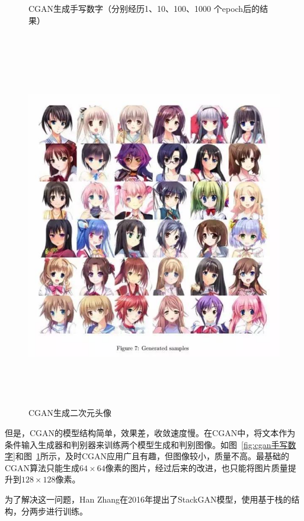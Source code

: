 \begin{figure}[t]
\begin{minipage}[c]{0.6\textwidth}
\begin{minipage}[c]{0.9\textwidth}
    \end{minipage}
  \caption{CGAN生成手写数字（分别经历1、10、100、1000 个epoch后的结果）} %
  \label{fig:cgan手写数字} 
  \end{minipage}
  \hfill 
  \begin{minipage}[c]{0.3\textwidth} 
  \centering%
  \centerline{\includegraphics[width=1\textwidth]{figures/moegirl.jpg}}
  \caption{CGAN生成二次元头像} 
  \label{fig:萌娘} 
  \end{minipage} 
  \end{figure}

但是，CGAN的模型结构简单，效果差，收敛速度慢。在CGAN中，将文本作为条件输入生成器和判别器来训练两个模型生成和判别图像。如图~\ref{fig:cgan手写数字}和图~\ref{fig:萌娘}所示，及时CGAN应用广且有趣，但图像较小，质量不高。最基础的CGAN算法只能生成$64\times64$像素的图片，经过后来的改进，也只能将图片质量提升到$128\times128$像素。

  为了解决这一问题，Han Zhang在2016年提出了StackGAN模型，使用基于栈的结构，分两步进行训练。
  
